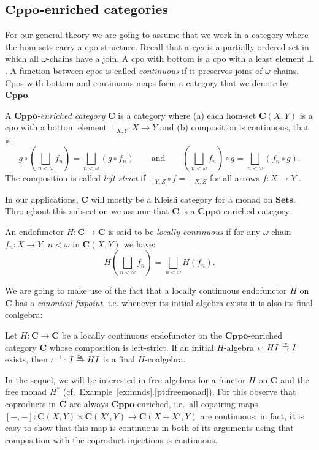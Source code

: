 \documentclass[oribibl,envcountsame,envcountsect,runningheads]{llncs}
\newcommand{\cat}[1]{\ensuremath{\mathbf{#1}}}
\newcommand{\Cat}[1]{\ensuremath{\mathbf{#1}}}
\newcommand{\Sets}{\Cat{Sets}}
\newcommand{\free}[1]{{#1^*}}
\newcommand{\cppo}{\cat{Cppo}}
\renewcommand{\>}{\rangle}
\newcommand{\congrightarrow}{\mathrel{\stackrel{
           \raisebox{.5ex}{$\scriptstyle\cong\,$}}{
           \raisebox{0ex}[0ex][0ex]{$\rightarrow$}}}}
\begin{document}
\subsection{$\cppo$-enriched categories}
\label{sec:cppo}

For our general theory we are going to assume that we work in a
category where the hom-sets carry a cpo structure. Recall that a
\emph{cpo} is a partially ordered set in which all $\omega$-chains
have a join. A cpo with bottom is a cpo with a least element $\bot$. A
function between cpos is called \emph{continuous} if it preserves
joins of $\omega$-chains. Cpos with bottom and continuous maps form a category
that we denote by $\cppo$.

A \emph{\cppo-enriched category} $\cat{C}$ is a category where (a)
each hom-set $\cat{C}(X,Y)$ is a cpo with a bottom element $\bot_{X,Y}\colon X \to Y$ and
(b) composition is continuous, that is:
$$ g \circ \left(\bigsqcup_{n< \omega} f_n\right) = \bigsqcup_{n< \omega} (g \circ f_n) \qquad \text{and}\qquad \left(\bigsqcup_{n < \omega} f_n\right) \circ g = \bigsqcup_{n< \omega} (f_n \circ g)\text{.}$$
The composition is called \emph{left strict} if $\bot_{Y,Z} \circ f
= \bot_{X,Z}$ for all arrows $f\colon X \to Y$
.

In our applications, $\cat C$ will mostly be a Kleisli category for a
monad on $\Sets$. Throughout this subsection we assume
that $\cat C$ is a $\cppo$-enriched category.

An endofunctor $H\colon \cat C \to \cat C $ is said to be \emph{locally
  continuous} if for any $\omega$-chain $f_n\colon X \to
Y$, $n < \omega$ in $\cat C(X,Y)$ we have:
\[
H\left(\bigsqcup_{n< \omega} f_n\right)= \bigsqcup_{n< \omega}H(f_n)\text{.}
\]

We are going to make use of the fact that a locally continuous endofunctor
$H$ on $\cat C$ has a \emph{canonical fixpoint}, i.e. whenever its
initial algebra exists it is also its final coalgebra:

\begin{theorem}\label{thm:Freyd}
 Let $H \colon \cat{C} \to \cat{C}$ be a locally continuous endofunctor on the \cppo-enriched category $\cat{C}$ whose composition is left-strict.
 If an initial $H$-algebra $\iota \colon HI \congrightarrow I$ exists,
 then $\iota^{-1} \colon I \congrightarrow HI$ is a final $H$-coalgebra.
\end{theorem}


In the sequel, we will be interested in free algebras for a
functor $H$ on $\cat C$ and the free monad $\free{H}$
(cf.~Example~\ref{ex:mnds}.\ref{pt:freemonad}). For this observe that coproducts in $\C$ are always $\cppo$-enriched, i.e.~all copairing maps $[-,-]:\cat C(X,Y) \times \cat C(X', Y) \to \cat C(X+X',Y)$ are continuous; in fact, it is easy to show that this map is continuous in both of its arguments using that composition with the coproduct injections is continuous.
\end{document}
